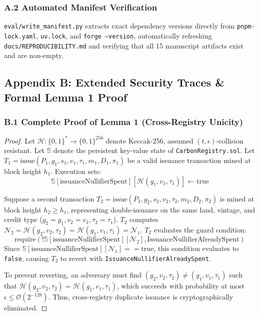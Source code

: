 \documentclass[preprint,12pt]{elsarticle}
\begin{document}
\subsubsection{A.2 Automated Manifest Verification}
\texttt{eval/write\_manifest.py} extracts exact dependency versions directly from \texttt{pnpm-lock.yaml}, \texttt{uv.lock}, and \texttt{forge --version}, automatically refreshing \texttt{docs/REPRODUCIBILITY.md} and verifying that all 15 manuscript artifacts exist and are non-empty.

\subsection{Appendix B: Extended Security Traces \& Formal Lemma 1 Proof}

\subsubsection{B.1 Complete Proof of Lemma 1 (Cross-Registry Unicity)}

\begin{proof} Let $\mathcal{H}: \{0,1\}^* \rightarrow \{0,1\}^{256}$ denote Keccak-256, assumed $(t, \epsilon)$-collision resistant. Let $\mathbb{S}$ denote the persistent key-value state of \texttt{CarbonRegistry.sol}.
Let $T_1 = \text{issue}(P_1, g_1, s_1, v_1, \tau_1, m_1, D_1, \pi_1)$ be a valid issuance transaction mined at block height $h_1$. 
Execution sets:
$$\mathbb{S}[\text{issuanceNullifierSpent}][\mathcal{H}(g_1, v_1, \tau_1)] \leftarrow \text{true}$$

Suppose a second transaction $T_2 = \text{issue}(P_2, g_2, s_2, v_2, \tau_2, m_2, D_2, \pi_2)$ is mined at block height $h_2 \ge h_1$, representing double-issuance on the same land, vintage, and credit type ($g_2 = g_1, v_2 = v_1, \tau_2 = \tau_1$).
$T_2$ computes $\mathcal{N}_2 = \mathcal{H}(g_2, v_2, \tau_2) = \mathcal{H}(g_1, v_1, \tau_1) = \mathcal{N}_1$.
$T_2$ evaluates the guard condition:
$$\text{require}(!\mathbb{S}[\text{issuanceNullifierSpent}][\mathcal{N}_2], \text{IssuanceNullifierAlreadySpent})$$
Since $\mathbb{S}[\text{issuanceNullifierSpent}][\mathcal{N}_1] == \text{true}$, this condition evaluates to \texttt{false}, causing $T_2$ to revert with \texttt{IssuanceNullifierAlreadySpent}. 

To prevent reverting, an adversary must find $(g_2, v_2, \tau_2) \neq (g_1, v_1, \tau_1)$ such that $\mathcal{H}(g_2, v_2, \tau_2) = \mathcal{H}(g_1, v_1, \tau_1)$, which succeeds with probability at most $\epsilon \le \mathcal{O}(2^{-128})$. Thus, cross-registry duplicate issuance is cryptographically eliminated. \end{proof}
\end{document}
